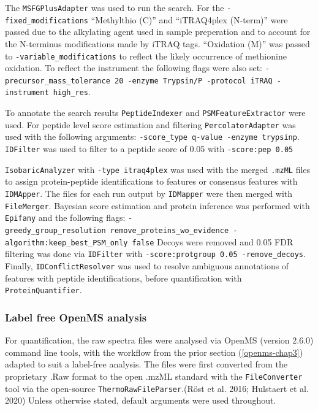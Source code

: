 \documentclass[9pt,lineno]{elife}
\begin{document}
The \texttt{MSFGPlusAdapter} was used to run the search.
For the \texttt{-fixed\_modifications} ``Methylthio (C)'' and ``iTRAQ4plex (N-term)'' were passed due to the alkylating agent used in sample preperation and to account for the N-terminus modifications made by iTRAQ tags.
``Oxidation (M)'' was passed to \texttt{-variable\_modifications} to reflect the likely occurrence of methionine oxidation.
To reflect the instrument the following flags were also set: \texttt{-precursor\_mass\_tolerance\ 20\ -enzyme\ Trypsin/P\ -protocol\ iTRAQ\ -instrument\ high\_res}.

To annotate the search results \texttt{PeptideIndexer} and \texttt{PSMFeatureExtractor} were used.
For peptide level score estimation and filtering \texttt{PercolatorAdapter} was used with the following arguments: \texttt{-score\_type\ q-value\ -enzyme\ trypsinp}.
\texttt{IDFilter} was used to filter to a peptide score of 0.05 with \texttt{-score:pep\ 0.05}

\texttt{IsobaricAnalyzer} with \texttt{-type\ itraq4plex} was used with the merged \texttt{.mzML} files to assign protein-peptide identifications to features or consensus features with \texttt{IDMApper}.
The files for each run output by \texttt{IDMapper} were then merged with \texttt{FileMerger}.
Bayesian score estimation and protein inference was performed with \texttt{Epifany} and the following flags: \texttt{-greedy\_group\_resolution\ remove\_proteins\_wo\_evidence\ -algorithm:keep\_best\_PSM\_only\ false} Decoys were removed and 0.05 FDR filtering was done via \texttt{IDFilter} with \texttt{-score:protgroup\ 0.05\ -remove\_decoys}.
Finally, \texttt{IDConflictResolver} was used to resolve ambiguous annotations of features with peptide identifications, before quantification with \texttt{ProteinQuantifier}.

\hypertarget{openms-label-free}{%
\subsubsection{Label free OpenMS analysis}\label{openms-label-free}}

For quantification, the raw spectra files were analysed via OpenMS (version 2.6.0) command line tools, with the workflow from the prior section (\ref{openms-chap3}) adapted to suit a label-free analysis.
The files were first converted from the proprietary .Raw format to the open .mzML standard with the \texttt{FileConverter} tool via the open-source \texttt{ThermoRawFileParser}.(Röst et al. 2016; Hulstaert et al. 2020) Unless otherwise stated, default arguments were used throughout.
\end{document}
